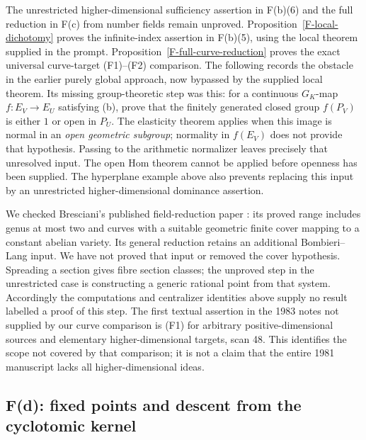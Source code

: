 \begin{remark}
\label{F-open-main}
The unrestricted higher-dimensional sufficiency assertion in
F(b)(6) and the full reduction in F(c) from number fields remain
unproved. Proposition~\ref{F-local-dichotomy} proves the
infinite-index assertion in F(b)(5), using the local theorem
supplied in the prompt. Proposition~\ref{F-full-curve-reduction}
proves the exact universal curve-target (F1)--(F2) comparison.
The following records the obstacle in the earlier purely global
approach, now bypassed by the supplied local theorem. Its missing
group-theoretic step was this: for a continuous
$G_K$-map $f:E_V\to E_U$ satisfying (b), prove that the finitely
generated closed group $f(P_V)$ is either $1$ or open in $P_U$.
The elasticity theorem applies when this image is normal in an
\emph{open geometric subgroup}; normality in $f(E_V)$ does not
provide that hypothesis. Passing to the arithmetic normalizer leaves
precisely that unresolved input. The open Hom theorem cannot be
applied before openness has been supplied. The hyperplane example
above also prevents replacing this input by an unrestricted
higher-dimensional dominance assertion.

We checked Bresciani's published field-reduction paper
\cite{F-BrescianiFiniteType}: its proved range includes genus at most
two and curves with a suitable geometric finite cover mapping to a
constant abelian variety. Its general reduction retains an additional
Bombieri--Lang input. We have not proved that input or removed the
cover hypothesis. Spreading a section gives fibre section classes;
the unproved step in the unrestricted case is constructing a generic
rational point from that system. Accordingly the computations and
centralizer identities above supply no result labelled a proof of
this step. The first textual assertion in the 1983 notes not supplied
by our curve comparison is (F1) for arbitrary positive-dimensional
sources and elementary higher-dimensional targets, scan 48. This
identifies the scope not covered by that comparison; it is not a
claim that the entire 1981 manuscript lacks all higher-dimensional
ideas.
\end{remark}

\subsection{F(d): fixed points and descent from the cyclotomic kernel}

